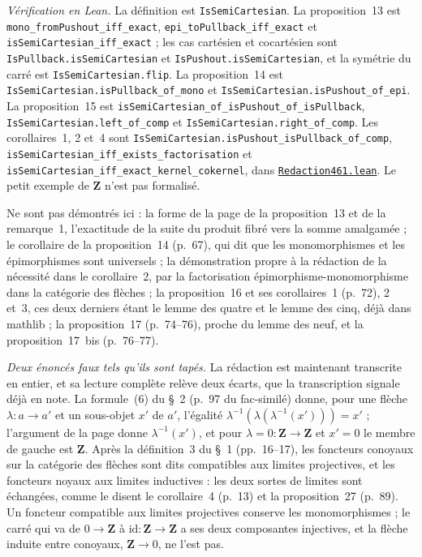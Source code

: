 \begin{sloppypar}
\noindent\emph{Vérification en Lean.} La définition est \texttt{IsSemiCartesian}. La proposition~13 est \texttt{mono\_fromPushout\_iff\_exact}, \texttt{epi\_toPullback\_iff\_exact} et \texttt{isSemiCartesian\_iff\_exact} ; les cas cartésien et cocartésien sont \texttt{IsPullback.\allowbreak{}isSemiCartesian} et \texttt{IsPushout.\allowbreak{}isSemiCartesian}, et la symétrie du carré est \texttt{IsSemiCartesian.\allowbreak{}flip}. La proposition~14 est \texttt{IsSemiCartesian.\allowbreak{}isPullback\_of\_mono} et \texttt{IsSemiCartesian.\allowbreak{}isPushout\_of\_epi}. La proposition~15 est \texttt{isSemiCartesian\_of\_isPushout\_of\_isPullback}, \texttt{IsSemiCartesian.\allowbreak{}left\_of\_comp} et \texttt{IsSemiCartesian.\allowbreak{}right\_of\_comp}. Les corollaires~1, 2 et~4 sont \texttt{IsSemiCartesian.\allowbreak{}isPushout\_isPullback\_of\_comp}, \texttt{isSemiCartesian\_iff\_exists\_factorisation} et \texttt{isSemiCartesian\_iff\_exact\_kernel\_cokernel}, dans \href{\leanblobmain/Redaction461.lean}{\texttt{Redaction461.\allowbreak{}lean}}. Le petit exemple de $\mathbf Z$ n'est pas formalisé.
\end{sloppypar}

Ne sont pas démontrés ici : la forme de la page de la proposition~13 et de la remarque~1, l'exactitude de la suite du produit fibré vers la somme amalgamée ; le corollaire de la proposition~14 (p.~67), qui dit que les monomorphismes et les épimorphismes sont universels ; la démonstration propre à la rédaction de la nécessité dans le corollaire~2, par la factorisation épimorphisme-monomorphisme dans la catégorie des flèches ; la proposition~16 et ses corollaires~1 (p.~72), 2 et~3, ces deux derniers étant le lemme des quatre et le lemme des cinq, déjà dans mathlib ; la proposition~17 (p.~74--76), proche du lemme des neuf, et la proposition~17~bis (p.~76--77).

\emph{Deux énoncés faux tels qu'ils sont tapés.} La rédaction est maintenant transcrite en entier, et sa lecture complète relève deux écarts, que la transcription signale déjà en note. La formule~(6) du §~2 (p.~97 du fac-similé) donne, pour une flèche $\lambda : a \to a'$ et un sous-objet $x'$ de $a'$, l'égalité $\lambda^{-1}(\lambda(\lambda^{-1}(x'))) = x'$ ; l'argument de la page donne $\lambda^{-1}(x')$, et pour $\lambda = 0 : \mathbf Z \to \mathbf Z$ et $x' = 0$ le membre de gauche est $\mathbf Z$. Après la définition~3 du §~1 (pp.~16--17), les foncteurs conoyaux sur la catégorie des flèches sont dits compatibles aux limites projectives, et les foncteurs noyaux aux limites inductives : les deux sortes de limites sont échangées, comme le disent le corollaire~4 (p.~13) et la proposition~27 (p.~89). Un foncteur compatible aux limites projectives conserve les monomorphismes ; le carré qui va de $0 \to \mathbf Z$ à $\mathrm{id} : \mathbf Z \to \mathbf Z$ a ses deux composantes injectives, et la flèche induite entre conoyaux, $\mathbf Z \to 0$, ne l'est pas.

